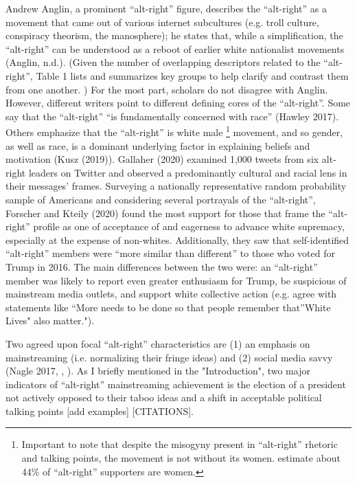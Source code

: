 \documentclass[acmlarge, screen, authorversion]{acmart}
\begin{document}
Andrew Anglin, a prominent “alt-right” figure, describes the “alt-right”
as a movement that came out of various internet subcultures (e.g. troll
culture, conspiracy theorism, the manosphere); he states that, while a
simplification, the “alt-right” can be understood as a reboot of earlier
white nationalist movements (Anglin, n.d.). (Given the number of
overlapping descriptors related to the “alt-right”, Table 1 lists and
summarizes key groups to help clarify and contrast them from one
another. ) For the most part, scholars do not disagree with Anglin.
However, different writers point to different defining cores of the
“alt-right”. Some say that the “alt-right” “is fundamentally concerned
with race” (Hawley 2017). Others emphasize that the “alt-right” is white
male \footnote{Important to note that despite the misogyny present in
“alt-right” rhetoric and talking points, the movement is not without its
women. \citet{forscherPsychologicalProfileAltRight2020} estimate about 44\% of “alt-right”
supporters are women.}
movement, and so gender, as well as race, is a dominant underlying
factor in explaining beliefs and motivation (Kusz (2019)). Gallaher (2020)
examined 1,000 tweets from six alt-right leaders on Twitter and observed
a predominantly cultural and racial lens in their messages’ frames.
Surveying a nationally representative random probability sample of
Americans and considering several portrayals of the “alt-right”,
Forscher and Kteily (2020) found the most support for those that frame
the “alt-right” profile as one of acceptance of and eagerness to advance
white supremacy, especially at the expense of non-whites. Additionally,
they saw that self-identified “alt-right” members were “more similar
than different” to those who voted for Trump in 2016. The main
differences between the two were: an “alt-right” member was likely to
report even greater enthusiasm for Trump, be suspicious of mainstream
media outlets, and support white collective action (e.g. agree with
statements like “More needs to be done so that people remember
that”White Lives" also matter.").

Two agreed upon focal “alt-right” characteristics are (1) an emphasis on
mainstreaming (i.e. normalizing their fringe ideas) and (2) social media
savvy (Nagle 2017, \cite{sternProudBoysWhite2019},
\cite{gallaherMainstreamingWhiteSupremacy2020}). As I briefly mentioned in the
"Introduction", two major indicators of “alt-right” mainstreaming
achievement is the election of a president not actively opposed to their
taboo ideas and a shift in acceptable political talking points [add
examples] [CITATIONS].
\end{document}
